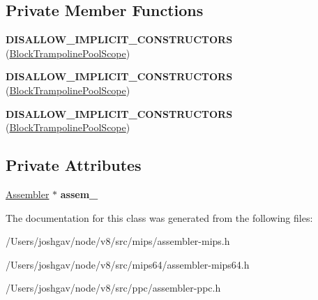 \subsection*{Private Member Functions}
\begin{DoxyCompactItemize}
\item 
{\bfseries D\+I\+S\+A\+L\+L\+O\+W\+\_\+\+I\+M\+P\+L\+I\+C\+I\+T\+\_\+\+C\+O\+N\+S\+T\+R\+U\+C\+T\+O\+RS} (\hyperlink{classv8_1_1internal_1_1_assembler_1_1_block_trampoline_pool_scope}{Block\+Trampoline\+Pool\+Scope})\hypertarget{classv8_1_1internal_1_1_assembler_1_1_block_trampoline_pool_scope_a5a530e107eac0189d5e70b6106e0fde4}{}\label{classv8_1_1internal_1_1_assembler_1_1_block_trampoline_pool_scope_a5a530e107eac0189d5e70b6106e0fde4}

\item 
{\bfseries D\+I\+S\+A\+L\+L\+O\+W\+\_\+\+I\+M\+P\+L\+I\+C\+I\+T\+\_\+\+C\+O\+N\+S\+T\+R\+U\+C\+T\+O\+RS} (\hyperlink{classv8_1_1internal_1_1_assembler_1_1_block_trampoline_pool_scope}{Block\+Trampoline\+Pool\+Scope})\hypertarget{classv8_1_1internal_1_1_assembler_1_1_block_trampoline_pool_scope_a5a530e107eac0189d5e70b6106e0fde4}{}\label{classv8_1_1internal_1_1_assembler_1_1_block_trampoline_pool_scope_a5a530e107eac0189d5e70b6106e0fde4}

\item 
{\bfseries D\+I\+S\+A\+L\+L\+O\+W\+\_\+\+I\+M\+P\+L\+I\+C\+I\+T\+\_\+\+C\+O\+N\+S\+T\+R\+U\+C\+T\+O\+RS} (\hyperlink{classv8_1_1internal_1_1_assembler_1_1_block_trampoline_pool_scope}{Block\+Trampoline\+Pool\+Scope})\hypertarget{classv8_1_1internal_1_1_assembler_1_1_block_trampoline_pool_scope_a5a530e107eac0189d5e70b6106e0fde4}{}\label{classv8_1_1internal_1_1_assembler_1_1_block_trampoline_pool_scope_a5a530e107eac0189d5e70b6106e0fde4}

\end{DoxyCompactItemize}
\subsection*{Private Attributes}
\begin{DoxyCompactItemize}
\item 
\hyperlink{classv8_1_1internal_1_1_assembler}{Assembler} $\ast$ {\bfseries assem\+\_\+}\hypertarget{classv8_1_1internal_1_1_assembler_1_1_block_trampoline_pool_scope_a3e09bf8eeb31d8a514d4b49d8123c5b0}{}\label{classv8_1_1internal_1_1_assembler_1_1_block_trampoline_pool_scope_a3e09bf8eeb31d8a514d4b49d8123c5b0}

\end{DoxyCompactItemize}


The documentation for this class was generated from the following files\+:\begin{DoxyCompactItemize}
\item 
/\+Users/joshgav/node/v8/src/mips/assembler-\/mips.\+h\item 
/\+Users/joshgav/node/v8/src/mips64/assembler-\/mips64.\+h\item 
/\+Users/joshgav/node/v8/src/ppc/assembler-\/ppc.\+h\end{DoxyCompactItemize}
